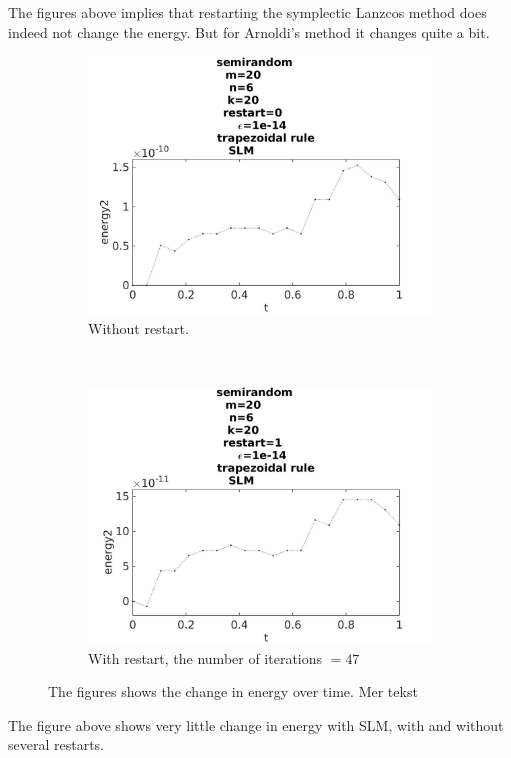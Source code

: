 The figures above implies that restarting the symplectic Lanzcos method does indeed not change the energy. But for Arnoldi's method it changes quite a bit. 

\begin{figure}[H]
        \centering
        \begin{subfigure}[b]{0.45\textwidth}
                \includegraphics[width=\textwidth]{../MATLAB/fig/energytestrestart0.jpg}
                \caption{ Without restart. }
                \label{fig:energytestrestart0}
        \end{subfigure}
        ~
        \begin{subfigure}[b]{0.45\textwidth}
                \includegraphics[width=\textwidth]{../MATLAB/fig/energytestrestart1.jpg}
                \caption{ With restart, the number of iterations $= 47$ }
                \label{fig:energytestrestart1}
        \end{subfigure}
        \caption{ The figures shows the change in energy over time. Mer tekst  }
        \label{fig:energytestrestart}
\end{figure}
The figure above shows very little change in energy with SLM, with and without several restarts. \\

